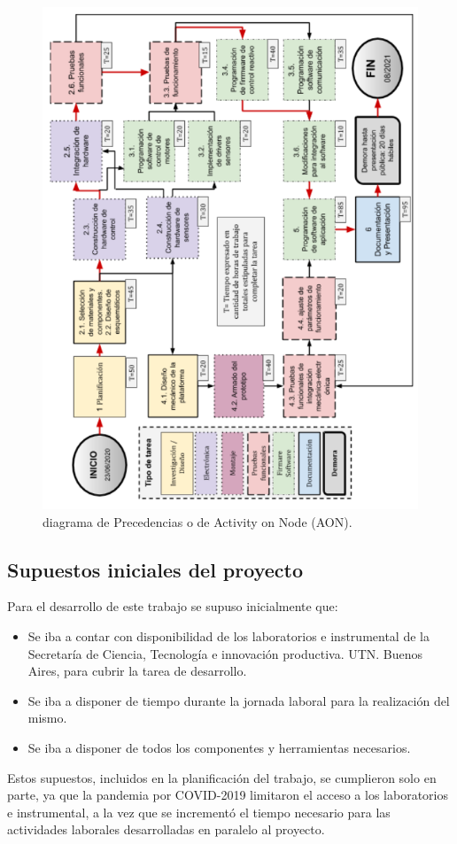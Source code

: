 \begin{figure}[htpb]
\centering 
\includegraphics[width=12cm]{./Figures/AoN.png}
\caption{diagrama de Precedencias o de Activity on Node (AON).}
\label{fig:AoN}
\end{figure}
\pagebreak

\subsection{Supuestos iniciales del proyecto}

Para el desarrollo de este trabajo se supuso inicialmente que:

\begin{itemize}
	\item Se iba a contar con disponibilidad de los laboratorios e instrumental de la  Secretaría de Ciencia, Tecnología e innovación productiva. UTN. Buenos Aires, para cubrir la tarea de desarrollo.
	\item Se iba a disponer de tiempo durante la jornada laboral para la realización del mismo. 
	\item Se iba a disponer de todos los componentes y herramientas necesarios.
\end{itemize}

Estos supuestos, incluidos en la planificación del trabajo, se cumplieron solo en parte, ya que la pandemia por COVID-2019 limitaron el acceso a los laboratorios e instrumental, a la vez que se incrementó el tiempo necesario para las actividades laborales desarrolladas en paralelo al proyecto. 




